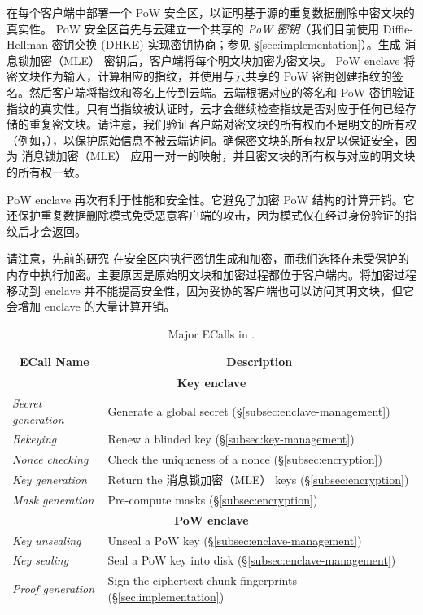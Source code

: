 \sysnameS 在每个客户端中部署一个 PoW 安全区，以证明基于源的重复数据删除中密文块的真实性。 PoW 安全区首先与云建立一个共享的 \textit{ PoW 密钥}（我们目前使用 Diffie-Hellman 密钥交换 (DHKE) 实现密钥协商；参见 \S\ref{sec:implementation}）。生成 消息锁加密（MLE） 密钥后，客户端将每个明文块加密为密文块。 PoW enclave 将密文块作为输入，计算相应的指纹，并使用与云共享的 PoW 密钥创建指纹的签名。然后客户端将指纹和签名上传到云端。云端根据对应的签名和 PoW 密钥验证指纹的真实性。只有当指纹被认证时，云才会继续检查指纹是否对应于任何已经存储的重复密文块。请注意，我们验证客户端对密文块的所有权而不是明文的所有权（例如，\cite{halevi11}），以保护原始信息不被云端访问。确保密文块的所有权足以保证安全，因为 消息锁加密（MLE） 应用一对一的映射，并且密文块的所有权与对应的明文块的所有权一致。

PoW enclave 再次有利于性能和安全性。它避免了加密 PoW 结构的计算开销。它还保护重复数据删除模式免受恶意客户端的攻击，因为模式仅在经过身份验证的指纹后才会返回。

请注意，先前的研究 \cite{kim19,fuhry20,djoko19} 在安全区内执行密钥生成和加密，而我们选择在未受保护的内存中执行加密。主要原因是原始明文块和加密过程都位于客户端内。将加密过程移动到 enclave 并不能提高安全性，因为妥协的客户端也可以访问其明文块，但它会增加 enclave 的大量计算开销。

\begin{table}[t]
\small
\centering
\begin{tabular}{|l|l|}
\hline
\multicolumn{1}{|c|}{\bf ECall Name} & \multicolumn{1}{c|}{\bf Description}\\ 
\hline
\hline
\multicolumn{2}{|c|}{\bf Key enclave} \\
\hline
\textit{ Secret generation} & Generate a global secret 
(\S\ref{subsec:enclave-management}) \\
\hline
\textit{ Rekeying} & Renew a blinded key 
(\S\ref{subsec:key-management}) \\
\hline
\textit{ Nonce checking} & Check the uniqueness of a nonce 
(\S\ref{subsec:encryption}) \\
\hline
\textit{ Key generation} & Return the 消息锁加密（MLE） keys (\S\ref{subsec:encryption}) \\
\hline
\textit{ Mask generation} & Pre-compute masks (\S\ref{subsec:encryption}) \\
\hline
\multicolumn{2}{|c|}{\bf PoW enclave} \\
\hline
  \textit{ Key unsealing} & Unseal a PoW key (\S\ref{subsec:enclave-management}) \\
\hline
  \textit{ Key sealing} & Seal a PoW key into disk (\S\ref{subsec:enclave-management})
\\
\hline
\textit{ Proof generation} & Sign the ciphertext chunk fingerprints 
(\S\ref{sec:implementation}) \\
\hline
\end{tabular}
\vspace{-6pt}
\caption{Major ECalls in \sysnameS.}
\label{tab:ecall}
\vspace{-3pt}
\end{table}


